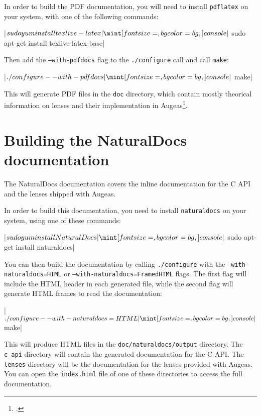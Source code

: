 In order to build the PDF documentation, you will need to install \verb!pdflatex! on your system, with one of the following commands:

\consolecode|$ sudo yum install texlive-latex|
\consolecode|$ sudo apt-get install texlive-latex-base|

Then add the \texttt{--with\allowbreak-pdfdocs} flag to the \texttt{./configure} call and call \texttt{make}:

\consolecode|$ ./configure --with-pdfdocs|
\consolecode|$ make|

This will generate PDF files in the \verb!doc! directory, which contain mostly theorical information on lenses and their implementation in Augeas\footnote{.}.


\section{Building the NaturalDocs documentation}

The NaturalDocs documentation covers the inline documentation for the C API and the lenses shipped with Augeas.


In order to build this documentation, you need to install \verb!naturaldocs! on your system, using one of these commands:

\consolecode|$ sudo yum install NaturalDocs|
\consolecode|$ sudo apt-get install naturaldocs|

You can then build the documentation by calling \texttt{./configure} with the \texttt{--with\allowbreak-naturaldocs=HTML} or \texttt{--with\allowbreak-naturaldocs=FramedHTML} flags. The first flag will include the HTML header in each generated file, while the second flag will generate HTML frames to read the documentation:

\consolecode|$ ./configure --with-naturaldocs=HTML|
\consolecode|$ make|

This will produce HTML files in the \verb!doc/naturaldocs/output! directory. The \verb!c_api! directory will contain the generated documentation for the C API. The \verb!lenses! directory will be the documentation for the lenses provided with Augeas. You can open the \verb!index.html! file of one of these directories to access the full documentation.

